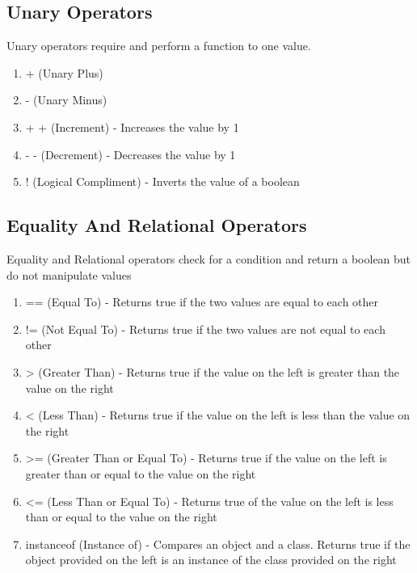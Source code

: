 \documentclass[a4paper]{article}
\begin{document}
\subsection*{Unary Operators}
Unary operators require and perform a function to one value.

\begin{enumerate}

\item + (Unary Plus)

\item - (Unary Minus)

\item + + (Increment) - Increases the value by 1

\item - - (Decrement) - Decreases the value by 1

\item ! (Logical Compliment) - Inverts the value of a boolean

\end{enumerate}

\subsection*{Equality And Relational Operators}
Equality and Relational operators check for a condition and return a boolean but
do not manipulate values
\begin{enumerate}

\item == (Equal To) - Returns true if the two values are equal to each other

\item != (Not Equal To) - Returns true if the two values are not equal to each
other

\item > (Greater Than) - Returns true if the value on the left is greater than
the value on the right

\item < (Less Than) - Returns true if the value on the left is less than the
value on the right

\item >= (Greater Than or Equal To) - Returns true if the value on the left is
greater than or equal to the value on the right

\item <= (Less Than or Equal To) - Returns true of the value on the left is less
than or equal to the value on the right

\item instanceof (Instance of) - Compares an object and a class. Returns true if
the object provided on the left is an instance of the class provided on the
right

\end{enumerate}
\end{document}
